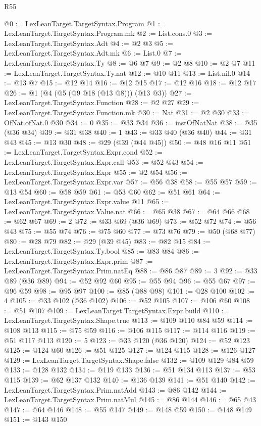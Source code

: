 \begin{lexlean}{R55}
\begin{coremodule}
@0 := LexLeanTarget.TargetSyntax.Program
@1 := LexLeanTarget.TargetSyntax.Program.mk
@2 := List.cons.{0}
@3 := LexLeanTarget.TargetSyntax.Adt
@4 := @2 @3
@5 := LexLeanTarget.TargetSyntax.Adt.mk
@6 := List.{0}
@7 := LexLeanTarget.TargetSyntax.Ty
@8 := @6 @7
@9 := @2 @8
@10 := @2 @7
@11 := LexLeanTarget.TargetSyntax.Ty.nat
@12 := @10 @11
@13 := List.nil.{0}
@14 := @13 @7
@15 := @12 @14
@16 := @12 @15
@17 := @12 @16
@18 := @12 @17
@26 := @1 (@4 (@5 (@9 @18 (@13 @8))) (@13 @3))
@27 := LexLeanTarget.TargetSyntax.Function
@28 := @2 @27
@29 := LexLeanTarget.TargetSyntax.Function.mk
@30 := Nat
@31 := @2 @30
@33 := OfNat.ofNat.{0} @30
@34 := 0
@35 := @33 @34
@36 := instOfNatNat
@38 := @35 (@36 @34)
@39 := @31 @38
@40 := 1
@43 := @33 @40 (@36 @40)
@44 := @31 @43
@45 := @13 @30
@48 := @29 (@39 (@44 @45))
@50 := @48 @16 @11
@51 := LexLeanTarget.TargetSyntax.Expr.cond
@52 := LexLeanTarget.TargetSyntax.Expr.call
@53 := @52 @43
@54 := LexLeanTarget.TargetSyntax.Expr
@55 := @2 @54
@56 := LexLeanTarget.TargetSyntax.Expr.var
@57 := @56 @38
@58 := @55 @57
@59 := @13 @54
@60 := @58 @59
@61 := @53 @60
@62 := @51 @61
@64 := LexLeanTarget.TargetSyntax.Expr.value @11
@65 := LexLeanTarget.TargetSyntax.Value.nat
@66 := @65 @38
@67 := @64 @66
@68 := @62 @67
@69 := 2
@72 := @33 @69 (@36 @69)
@73 := @52 @72
@74 := @56 @43
@75 := @55 @74
@76 := @75 @60
@77 := @73 @76
@79 := @50 (@68 @77)
@80 := @28 @79
@82 := @29 (@39 @45)
@83 := @82 @15
@84 := LexLeanTarget.TargetSyntax.Ty.bool
@85 := @83 @84
@86 := LexLeanTarget.TargetSyntax.Expr.prim
@87 := LexLeanTarget.TargetSyntax.Prim.natEq
@88 := @86 @87
@89 := 3
@92 := @33 @89 (@36 @89)
@94 := @52 @92 @60
@95 := @55 @94
@96 := @55 @67
@97 := @96 @59
@98 := @95 @97
@100 := @85 (@88 @98)
@101 := @28 @100
@102 := 4
@105 := @33 @102 (@36 @102)
@106 := @52 @105
@107 := @106 @60
@108 := @51 @107
@109 := LexLeanTarget.TargetSyntax.Expr.build
@110 := LexLeanTarget.TargetSyntax.Shape.true
@113 := @109 @110 @84 @59
@114 := @108 @113
@115 := @75 @59
@116 := @106 @115
@117 := @114 @116
@119 := @51 @117 @113
@120 := 5
@123 := @33 @120 (@36 @120)
@124 := @52 @123
@125 := @124 @60
@126 := @51 @125
@127 := @124 @115
@128 := @126 @127
@129 := LexLeanTarget.TargetSyntax.Shape.false
@132 := @109 @129 @84 @59
@133 := @128 @132
@134 := @119 @133
@136 := @51 @134 @113
@137 := @53 @115
@139 := @62 @137 @132
@140 := @136 @139
@141 := @51 @140
@142 := LexLeanTarget.TargetSyntax.Prim.natAdd
@143 := @86 @142
@144 := LexLeanTarget.TargetSyntax.Prim.natMul
@145 := @86 @144
@146 := @65 @43
@147 := @64 @146
@148 := @55 @147
@149 := @148 @59
@150 := @148 @149
@151 := @143 @150

\end{coremodule}
\end{lexlean}
